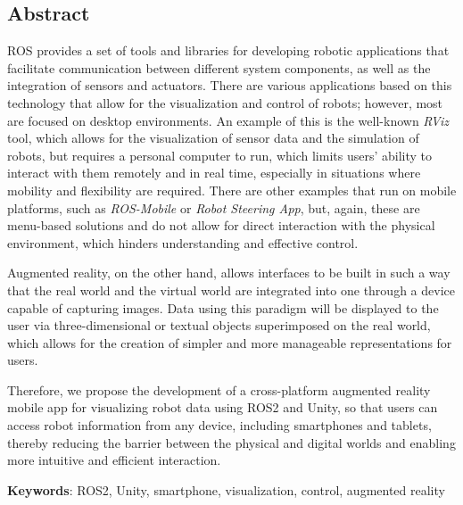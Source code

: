 %
\noindent \begin{center}
\section*{Abstract}
\par\end{center}

ROS provides a set of tools and libraries for developing robotic applications
that facilitate communication between different system components, as well as the integration of sensors and actuators.
There are various applications based on this technology that allow for the visualization and control of robots; however,
most are focused on desktop environments.
An example of this is the well-known \textit{RViz} tool, which allows for the visualization of sensor data and the simulation of robots,
but requires a personal computer to run,
which limits users' ability to interact with them remotely and in real time, especially in situations
where mobility and flexibility are required.
There are other examples that run on mobile platforms, such as \textit{ROS-Mobile} or \textit{Robot Steering App}, but,
again, these are menu-based solutions and do not allow for direct interaction with the physical environment, which hinders
understanding and effective control.

Augmented reality, on the other hand, allows interfaces to be built in such a way that the real world and the virtual world are integrated into one through
a device capable of capturing images. Data using this paradigm will be displayed to the user via
three-dimensional or textual objects superimposed on the real world, which allows for
the creation of simpler and more manageable representations for users.

Therefore, we propose the development of a cross-platform augmented reality mobile app for visualizing
robot data using ROS2 and Unity,
so that users can access robot information from any device, including smartphones and tablets,
thereby reducing the barrier between the physical and digital worlds and enabling more intuitive and efficient interaction.

\vspace{0.5cm}
\begin{flushleft}
\textbf{Keywords}: ROS2, Unity, smartphone, visualization, control, augmented reality
\end{flushleft}
%